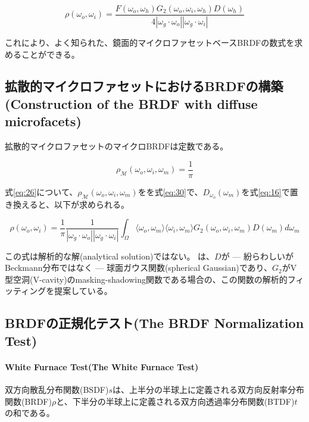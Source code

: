 \documentclass[a4j,xelatex,ja=standard]{bxjsarticle}
\begin{document}
\begin{equation}
    \rho(\omega_o, \omega_i) = \frac{F(\omega_o, \omega_h) G_2(\omega_o, \omega_i, \omega_h) D(\omega_h)}{4|\omega_g \cdot \omega_o| |\omega_g \cdot \omega_i|}
    \label{eq:29}
\end{equation}

これにより、よく知られた、鏡面的マイクロファセットベースBRDFの数式を求めることができる\cite{Walter2007}。

\subsection{拡散的マイクロファセットにおけるBRDFの構築(Construction of the BRDF with diffuse microfacets)}

拡散的マイクロファセットのマイクロBRDFは定数である。

\begin{equation}
    \rho_{\mathcal M}(\omega_o, \omega_i, \omega_m) = \frac{1}{\pi}
    \label{eq:30}
\end{equation}

式\eqref{eq:26}について、$\rho_{\mathcal M}(\omega_o, \omega_i, \omega_m)$をを式\eqref{eq:30}で、$D_{\omega_o}(\omega_m)$を式\eqref{eq:16}で置き換えると、以下が求められる。

\begin{equation}
    \rho(\omega_o, \omega_i) = \frac{1}{\pi} \frac{1}{|\omega_g \cdot \omega_o| |\omega_g \cdot \omega_i|} \int_{\Omega} \langle \omega_o, \omega_m \rangle \langle \omega_i, \omega_m \rangle G_2(\omega_o, \omega_i, \omega_m) D(\omega_m) d\omega_m
    \label{eq:31}
\end{equation}

この式は解析的な解(analytical solution)ではない。\citeauthor{Oren1994} \cite{Oren1994}は、$D$が --- 紛らわしいがBeckmann分布ではなく --- 球面ガウス関数(spherical Gaussian)であり、$G_2$がV型空洞(V-cavity)のmasking-shadowing関数である場合の、この関数の解析的フィッティングを提案している。

\subsection{BRDFの正規化テスト(The BRDF Normalization Test)}

\paragraph{White Furnace Test(The White Furnace Test)}

双方向散乱分布関数(BSDF)$s$は、上半分の半球上に定義される双方向反射率分布関数(BRDF)$\rho$と、下半分の半球上に定義される双方向透過率分布関数(BTDF)$t$の和である。
\end{document}
